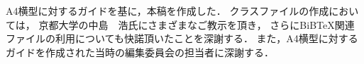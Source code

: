 \begin{acknowledgment}
A4横型に対するガイドを基に，本稿を作成した．
クラスファイルの作成においては，
京都大学の中島　浩氏にさまざまなご教示を頂き，
さらにBiB\TeX 関連ファイルの利用についても快諾頂いたことを深謝する．
また，A4横型に対するガイドを作成された当時の編集委員会の担当者に深謝する．
\end{acknowledgment}
